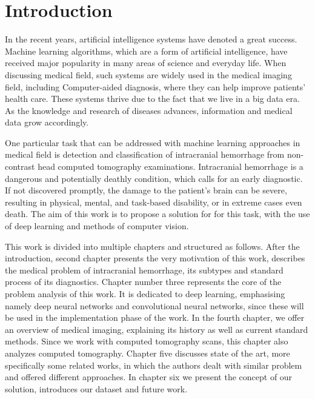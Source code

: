 \chapter{Introduction}


In the recent years, artificial intelligence systems have denoted a great success. Machine learning algorithms, which are a form of artificial intelligence, have received major popularity in many areas of science and everyday life. When discussing medical field, such systems are widely used in the medical imaging field, including Computer-aided diagnosis, where they can help improve patients’ health care. These systems thrive due to the fact that we live in a big data era. As the knowledge and research of diseases advances, information and medical data grow accordingly. 


One particular task that can be addressed with machine learning approaches in medical field is detection and classification of intracranial hemorrhage from non-contrast head computed tomography examinations. Intracranial hemorrhage is a dangerous and potentially deathly condition, which calls for an early diagnostic. If not discovered promptly, the damage to the patient's brain can be severe, resulting in physical, mental, and task-based disability, or in extreme cases even death. The aim of this work is to propose a solution for for this task, with the use of deep learning and methods of computer vision. 


This work is divided into multiple chapters and structured as follows. After the introduction, second chapter presents the very motivation of this work, describes the medical problem of intracranial hemorrhage, its subtypes and standard process of its diagnostics. Chapter number three represents the core of the problem analysis of this work. It is dedicated to deep learning, emphasising namely deep neural networks and convolutional neural networks, since these will be used in the implementation phase of the work. In the fourth chapter, we offer an overview of medical imaging, explaining its history as well as current standard methods. Since we work with computed tomography scans, this chapter also analyzes computed tomography. Chapter five discusses state of the art, more specifically some related works, in which the authors dealt with similar problem and offered different approaches. In chapter six we present the concept of our solution, introduces our dataset and future work.
